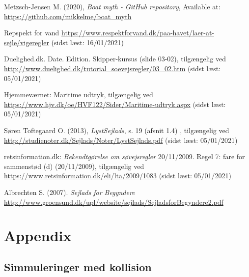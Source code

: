 \documentclass[%
 reprint,
nofootinbib,
aps,
]{revtex4-1}
\begin{document}
\begin{thebibliography}{9}
   Metzsch-Jensen M. (2020), \textit{Boat myth - GitHub repository}, Available at: \url{https://github.com/mikkelme/boat_myth}

   Repspekt for vand \url{https://www.respektforvand.dk/paa-havet/laer-at-sejle/vigeregler} (sidst læst: 16/01/2021)

   Duelighed.dk. Date. Edition. Skipper-kursus (slide 03-02), tilgængelig ved \url{http://www.duelighed.dk/tutorial_soevejsregler/03_02.htm} (sidst læst: 05/01/2021)

   Hjemmeværnet: Maritime udtryk, tilgængelig ved \url{https://www.hjv.dk/oe/HVF122/Sider/Maritime-udtryk.aspx} (sidst læst: 05/01/2021)

   Søren Toftegaard O. (2013), \textit{LystSejlads}, s. 19 (afsnit 1.4) , tilgængelig ved \url{http://studienoter.dk/Sejlads/Noter/LystSejlads.pdf} (sidst læst: 05/01/2021)

  \pagebreak
   retsinformation.dk: \textit{Bekendtgørelse om søvejsregler} 20/11/2009. Regel 7: fare for sammenstød (d) (20/11/2009), tilgængelig ved \url{https://www.retsinformation.dk/eli/lta/2009/1083} (sidst læst: 05/01/2021)

   Albrechten S. (2007). \textit{Sejlads for Begyndere} \url{http://www.groensund.dk/upl/website/sejlads/SejladsforBegyndere2.pdf}


\end{thebibliography}

\clearpage
\onecolumngrid
\section{Appendix}\label{sec:appendix}

\subsection{Simmuleringer med kollision}
\end{document}
